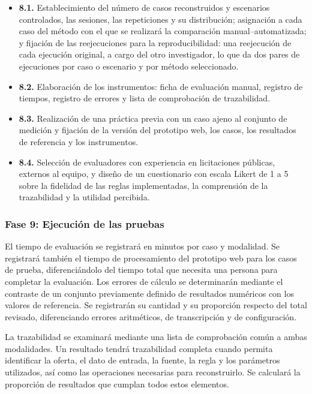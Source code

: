 \documentclass[12pt,a4paper]{article}
\begin{document}
\begin{itemize}
\item \textbf{8.1.} Establecimiento del número de casos reconstruidos y escenarios controlados, las sesiones, las repeticiones y su distribución; asignación a cada caso del método con el que se realizará la comparación manual–automatizada; y fijación de las reejecuciones para la reproducibilidad: una reejecución de cada ejecución original, a cargo del otro investigador, lo que da dos pares de ejecuciones por caso o escenario y por método seleccionado.
\item \textbf{8.2.} Elaboración de los instrumentos: ficha de evaluación manual, registro de tiempos, registro de errores y lista de comprobación de trazabilidad.
\item \textbf{8.3.} Realización de una práctica previa con un caso ajeno al conjunto de medición y fijación de la versión del prototipo web, los casos, los resultados de referencia y los instrumentos.
\item \textbf{8.4.} Selección de evaluadores con experiencia en licitaciones públicas, externos al equipo, y diseño de un cuestionario con escala Likert de 1 a 5 sobre la fidelidad de las reglas implementadas, la comprensión de la trazabilidad y la utilidad percibida.
\end{itemize}

\subsubsection{Fase 9: Ejecución de las pruebas}

El tiempo de evaluación se registrará en minutos por caso y modalidad. Se registrará también el tiempo de procesamiento del prototipo web para los casos de prueba, diferenciándolo del tiempo total que necesita una persona para completar la evaluación. Los errores de cálculo se determinarán mediante el contraste de un conjunto previamente definido de resultados numéricos con los valores de referencia. Se registrarán su cantidad y su proporción respecto del total revisado, diferenciando errores aritméticos, de transcripción y de configuración.

La trazabilidad se examinará mediante una lista de comprobación común a ambas modalidades. Un resultado tendrá trazabilidad completa cuando permita identificar la oferta, el dato de entrada, la fuente, la regla y los parámetros utilizados, así como las operaciones necesarias para reconstruirlo. Se calculará la proporción de resultados que cumplan todos estos elementos.
\end{document}

